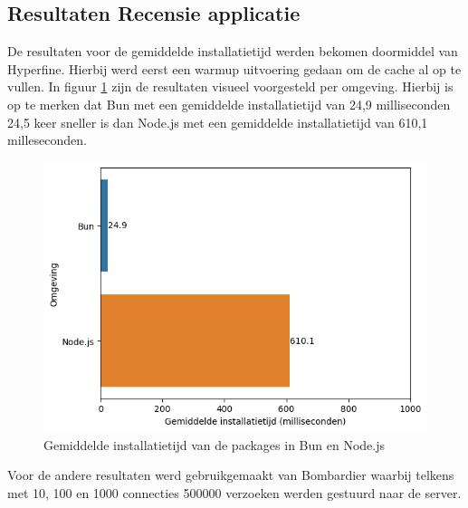 \subsection{Resultaten Recensie applicatie}
De resultaten voor de gemiddelde installatietijd werden bekomen doormiddel van Hyperfine.
Hierbij werd eerst een warmup uitvoering gedaan om de cache al op te vullen.
In figuur \ref{fig:installatietijdapp} zijn de resultaten visueel voorgesteld per omgeving.
Hierbij is op te merken dat Bun met een gemiddelde installatietijd van 24,9 milliseconden 24,5 keer sneller 
is dan Node.js met een gemiddelde installatietijd van 610,1 milleseconden.
\begin{figure}[H]
  \centering
  \includegraphics{graphics/install.png}
  \caption{\label{fig:installatietijdapp}Gemiddelde installatietijd van de packages in Bun en Node.js}
\end{figure}

Voor de andere resultaten werd gebruikgemaakt van Bombardier waarbij telkens met 10, 100 en 1000 connecties 
500000 verzoeken werden gestuurd naar de server.

